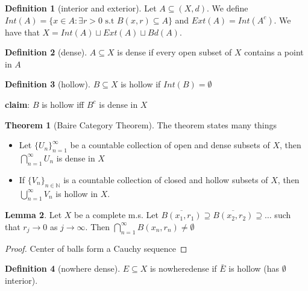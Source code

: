\documentclass[12pt]{article}
\theoremstyle{definition}
\newtheorem{theorem}{Theorem}[section]
\newtheorem{lemma}[theorem]{Lemma}
\newtheorem{definition}{Definition}[section]
\begin{document}
	\begin{definition}[interior and exterior]
		Let $A \subseteq (X,d)$. We define $Int(A) = \{x \in A\colon \exists r > 0 \text{ s.t } B(x,r) \subseteq A\}$ and $Ext(A) = Int(A^c)$. We have that $X = Int(A) \sqcup Ext(A) \sqcup Bd(A)$.


	\end{definition}
	\begin{definition}[dense]
		$A \subseteq X$ is dense if every open subset of $X$ contains a point in $A$	
	\end{definition}

	\begin{definition}[hollow]
		$B \subseteq X$ is hollow if $Int(B) = \emptyset$	
	\end{definition}
	\textbf{claim}: $B$ is hollow iff $B^c$ is dense in $X$
	\begin{theorem}[Baire Category Theorem]
		The theorem states many things
		\begin{itemize}
			\item Let $\{U_n\}_{n =1}^\infty $ be a countable collection of open and dense subsets of $X$, then $\bigcap_{n=1}^\infty U_n$ is dense in $X$
			\item If $\{V_n\}_{n \in \mathbb{N}}$ is a countable collection of closed and hollow  subsets of $X$, then $\bigcup_{n=1}^\infty V_n$ is hollow in $X$.
		\end{itemize}	
	\end{theorem}

	\begin{lemma}
		Let $X$ be a complete m.s. Let $\overline{B(x_1,r_1)} \supseteq \overline{B(x_2,r_2)} \supseteq \ldots$ such that $r_j \to 0$ as $j \to \infty$. Then $\bigcap_{n=1}^\infty B(x_n, r_n) \neq \emptyset$
	\end{lemma}
	\begin{proof}
		Center of balls form a Cauchy sequence
	\end{proof}
	\begin{definition}[nowhere dense]
		$E \subseteq X$ is nowheredense if $\bar{E}$ is hollow (has $\emptyset$ interior).
	\end{definition}
\end{document}
